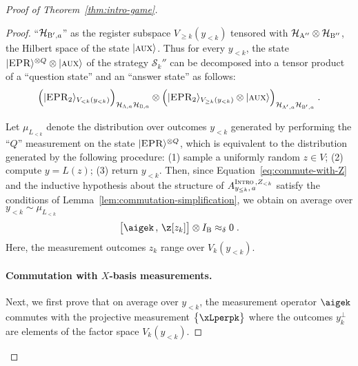 \documentclass[11pt]{article}
\theoremstyle{definition}
\newcommand{\ket}[1]{|#1\rangle}
\newcommand{\Id}{\ensuremath{I}}
\newcommand{\mH}{\ensuremath{\mathcal{H}}}
\newcommand{\ib}{\Id_\bob}
\newcommand{\strategy}{\mathscr{S}}
\newcommand{\labelstyle}[1]{\ensuremath{\textsc{#1}}\xspace}
\newcommand{\EPR}{\labelstyle{EPR}}
\newcommand{\aux}{\labelstyle{aux}}
\newcommand{\alice}{\labelstyle{A}}
\newcommand{\bob}{\labelstyle{B}}
\newcommand{\typestyle}[1]{\ensuremath{\textsc{#1}}\xspace}
\newcommand{\Intro}{\typestyle{Intro}}
\begin{document}
\begin{proof}[Proof of Theorem~\ref{thm:intro-game}]
\begin{proof}
    ``$\mH_{\bob',a}$'' as the register subspace $V_{\geq k}(y_{<k})$ tensored
    with $\mH_{\alice''} \otimes \mH_{\bob''}$, the Hilbert space of the state
    $\ket{\aux}$.
    Thus for every $y_{<k}$, the state $\ket{\EPR}^{\otimes Q} \otimes
    \ket{\aux}$ of the strategy $\strategy_k''$ can be decomposed into a tensor
    product of a ``question state'' and an ``answer state'' as follows:
    \[
      \Big ( \ket{\EPR_2}_{V_{<k}(y_{<k})} \Big)_{\mH_{\alice,a} \mH_{\bob,a}}
      \otimes \Big ( \ket{\EPR_2}_{V_{\geq k}(y_{<k})} \otimes \ket{\aux}
      \Big)_{\mH_{\alice',a} \mH_{\bob',a}}\;.
    \]

    Let $\mu_{L_{<k}}$ denote the distribution over outcomes $y_{< k}$ generated
    by performing the ``$Q$'' measurement on the state $\ket{\EPR}^{\otimes Q}$,
    which is equivalent to the distribution generated by the following
    procedure: (1) sample a uniformly random $z \in V$; (2) compute $y = L(z)$;
    (3) return $y_{<k}$.
    Then, since Equation~\eqref{eq:commute-with-Z} and the inductive hypothesis
    about the structure of $A^{\Intro\,,Z_{<k}}_{y_{\leq k},\,a}$ satisfy the
    conditions of Lemma~\ref{lem:commutation-simplification}, we obtain on
    average over $y_{< k} \sim \mu_{L_{< k}}$
    \begin{equation}
      \label{eq:intro-sound-5}
      \bigl[ \aigek \,,\, \z[z_k] \bigr] \otimes \ib \approx_\delta 0 \;.
    \end{equation}
    Here, the measurement outcomes $z_k$ range over $V_k(y_{<k})$.

    \paragraph{Commutation with $X$-basis measurements.}
    Next, we first prove that on average over $y_{< k}$, the measurement
    operator $\aigek$ commutes with the projective measurement
    $\bigl\{ \xLperpk \bigr\}$ where the
    outcomes $y_k^\perp$ are elements of the factor space $V_k(y_{<k})$.
  

\end{proof}
\end{proof}
\end{document}
